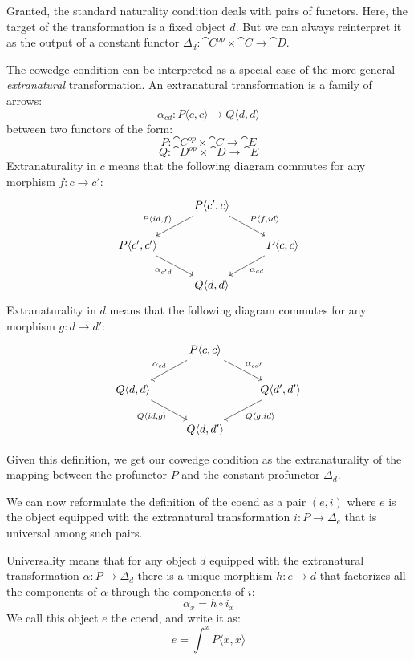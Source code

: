 \documentclass[DaoFP]{subfiles}
\begin{document}
Granted, the standard naturality condition deals with pairs of functors. Here, the target of the transformation is a fixed object $d$. But we can always reinterpret it as the output of a constant functor $\Delta_d \colon \cat C^{op} \times \cat C \to \cat D$.

The cowedge condition can be interpreted as a special case of the more general \emph{extranatural} transformation. An extranatural transformation is a family of arrows:
\[ \alpha_{c d} \colon P \langle c, c \rangle \to Q \langle d, d \rangle \]
between two functors of the form:
\[ P \colon \cat C^{op} \times \cat C \to \cat E \]
\[ Q \colon \cat D^{op} \times \cat D \to \cat E \]
Extranaturality in $c$ means that the following diagram commutes for any morphism $f \colon c \to c'$:
\[
 \begin{tikzcd}
 &P \langle c', c \rangle
 \arrow[ld, "{P \langle id, f \rangle}"']
 \arrow[rd, "{P \langle f, id \rangle}"]
 \\
      P \langle c', c' \rangle
 \arrow[dr, "\alpha_{c' d}"']
 &&P \langle c, c \rangle
 \arrow[dl, "\alpha_{c d}"]
 \\
 & Q \langle d, d \rangle
 \end{tikzcd}
\]
Extranaturality in $d$ means that the following diagram commutes for any morphism $g \colon d \to d'$:
\[
 \begin{tikzcd}
 &P \langle c, c \rangle
 \arrow[ld, "\alpha_{c d}"']
 \arrow[rd, "\alpha_{c d'}"]
 \\
      Q \langle d, d \rangle
 \arrow[dr, "{Q \langle id, g\rangle}"']
 &&Q \langle d', d' \rangle
 \arrow[dl, "{Q \langle g,  id\rangle}"]
 \\
 & Q \langle d, d' \rangle
 \end{tikzcd}
\]

Given this definition, we get our cowedge condition as the extranaturality of the mapping between the profunctor $P$ and the constant profunctor $\Delta_d$. 

We can now reformulate the definition of the coend as a pair $(e, i)$ where $e$ is the object equipped with the extranatural transformation  $i \colon P \to \Delta_e$ that is universal among such pairs.

Universality means that for any object $d$ equipped with the extranatural transformation $\alpha \colon P \to \Delta_d$ there is a unique morphism $h \colon e \to d$ that factorizes all the components of $\alpha$ through the components of $i$:
\[ \alpha_x = h \circ i_x \]
We call this object $e$ the coend, and write it as:
\[ e = \int^x P\langle x, x \rangle \]
\end{document}
